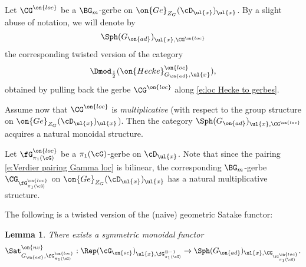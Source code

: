 \documentclass[9pt]{amsart}
\newtheorem{lem}[subsubsection]{Lemma}
\theoremstyle{remark}
\theoremstyle{definition}
\theoremstyle{remark}
\numberwithin{equation}{section}
\begin{document}
\sssec{}

Let $\CG^{\on{loc}}$ be a $\BG_m$-gerbe on $\on{Ge}_{Z_G}(\cD_{\ul{x}})_{\ul{x}}$. By a slight abuse of notation,
we will denote by
$$\Sph(G_{\on{ad}})_{\ul{x},\CG^{\on{loc}}}$$ 
the corresponding twisted version of the category
$$\Dmod_{\frac{1}{2}}(\on{Hecke}^{\on{loc}}_{G_{\on{ad}},\ul{x}}),$$
obtained by pulling back the gerbe $\CG^{\on{loc}}$ along \eqref{e:loc Hecke to gerbes}.

\medskip

Assume now that $\CG^{\on{loc}}$ is \emph{multiplicative} (with respect to the group structure on $\on{Ge}_{Z_G}(\cD_{\ul{x}})_{\ul{x}}$).
Then the category $\Sph(G_{\on{ad}})_{\ul{x},\CG^{\on{loc}}}$ acquires a natural monoidal structure. 

\sssec{}

Let $\fG^{\on{loc}}_{\pi_1(\cG)}$ be a $\pi_1(\cG)$-gerbe on $\cD_{\ul{x}}$. Note that since the pairing 
\eqref{e:Verdier pairing Gamma loc} is bilinear, the corresponding $\BG_m$-gerbe $\CG_{\fG^{\on{loc}}_{\pi_1(\cG)}}$ on 
$\on{Ge}_{Z_G}(\cD_{\ul{x}})_{\ul{x}}$ has a natural multiplicative structure.

\medskip

The following is a twisted version of the (naive) geometric Satake functor:

\begin{lem}
There exists a symmetric monoidal functor
$$\Sat^{\on{nv}}_{G_{\on{ad}},\fG^{\on{loc}}_{\pi_1(\cG)}}:
\Rep(\cG_{\on{sc}})_{\ul{x},\fG^{\otimes -1}_{\pi_1(\cG)}}\to \Sph(G_{\on{ad}})_{\ul{x},\CG_{\fG^{\on{loc}}_{\pi_1(\cG)}}}.$$
\end{lem} 
\end{document}
